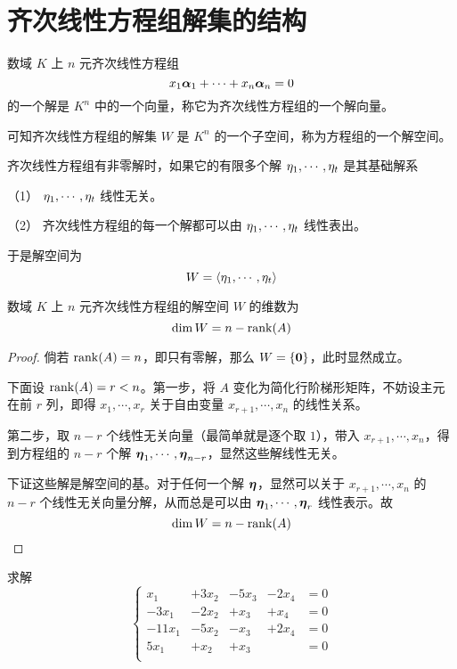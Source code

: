 \section{齐次线性方程组解集的结构}

数域 $K$ 上 $n$ 元齐次线性方程组
\[x_1\boldsymbol{\alpha}_1 + \cdots + x_n\boldsymbol{\alpha}_n = 0\]
的一个解是 $K^n$ 中的一个向量，称它为齐次线性方程组的一个解向量。

可知齐次线性方程组的解集 $W$ 是 $K^n$ 的一个子空间，称为方程组的一个解空间。

\begin{definition}
	齐次线性方程组有非零解时，如果它的有限多个解 $\eta_1,\cdots,\eta_t$ 是其基础解系

	（1） $\eta_1,\cdots,\eta_t$ 线性无关。

	（2） 齐次线性方程组的每一个解都可以由 $\eta_1,\cdots,\eta_t$ 线性表出。
\end{definition}

于是解空间为
\[W = \langle \eta_1,\cdots,\eta_t \rangle\]

\begin{theorem}
	数域 $K$ 上 $n$ 元齐次线性方程组的解空间 $W$ 的维数为
	\[\dim W = n-\operatorname{rank}(A)\]
\end{theorem}

\begin{proof}
	倘若 $\operatorname{rank}(A) = n$，即只有零解，那么 $W = \{\boldsymbol{0}\}$，此时显然成立。

	下面设 $\operatorname{rank}(A) = r < n$。第一步，将 $A$ 变化为简化行阶梯形矩阵，不妨设主元在前 $r$ 列，即得 $x_1, \cdots, x_r$ 关于自由变量 $x_{r+1}, \cdots, x_n$ 的线性关系。

	第二步，取 $n-r$ 个线性无关向量（最简单就是逐个取 $1$），带入 $x_{r+1}, \cdots, x_n$，得到方程组的 $n-r$ 个解 $\boldsymbol{\eta}_1,\cdots,\boldsymbol{\eta}_{n-r}$，显然这些解线性无关。

	下证这些解是解空间的基。对于任何一个解 $\boldsymbol{\eta}$，显然可以关于 $x_{r+1}, \cdots, x_n$ 的 $n-r$ 个线性无关向量分解，从而总是可以由 $\boldsymbol{\eta}_1,\cdots,\boldsymbol{\eta}_r$ 线性表示。故
	\[ \dim W = n - \operatorname{rank}(A) \]
\end{proof}

\begin{example}
	求解
	\[ \left\{
		\begin{aligned}
			x_1    & + 3x_2 & - 5x_3 & - 2x_4 & = 0 \\
			-3x_1  & - 2x_2 & + x_3  & + x_4  & = 0 \\
			-11x_1 & - 5x_2 & - x_3  & + 2x_4 & = 0 \\
			5x_1   & + x_2  & +x_3   &        & = 0 \\
		\end{aligned} \right. \]
\end{example}

